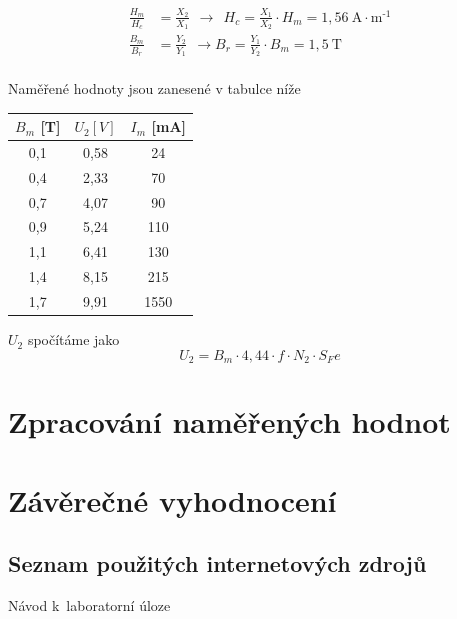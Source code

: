 \documentclass[a4paper,12pt]{article}   %
\begin{document}
\begin{equation}
  \begin{split}
    \frac{H_m}{H_c} &= \frac{X_2}{X_1} ~~\rightarrow~~H_c = \frac{X_1}{X_2}\cdot H_m = 1,56~\text{A}\cdot\text{m}^\text{-1}\\
    \frac{B_m}{B_r} &= \frac{Y_2}{Y_1} ~~\rightarrow B_r = \frac{Y_1}{Y_2}\cdot B_m = 1,5~\text{T}\\
  \end{split}
\end{equation}

Naměřené hodnoty jsou zanesené v tabulce níže
\begin{table}[h!]
  \centering
  \begin{tabular}{|c|c|c|}
  \hline
  $B_m$ [T] &$U_\text{2} [V]$& $I_m$ [mA]\\\hline\hline
  0,1 & 0,58  & 24   \\ \hline
  0,4 & 2,33  & 70   \\ \hline
  0,7 & 4,07  & 90   \\ \hline
  0,9 & 5,24  & 110  \\ \hline
  1,1 & 6,41  & 130  \\ \hline
  1,4 & 8,15  & 215  \\ \hline
  1,7 & 9,91  & 1550 \\ \hline
  \end{tabular}
\end{table}
$U_2$ spočítáme jako
\begin{equation}
  U_2 = B_m\cdot 4,44 \cdot f\cdot N_2\cdot S_Fe
\end{equation}

\section{Zpracování naměřených hodnot}
\label{chap:zpracovani_hodnot}



\section{Závěrečné vyhodnocení}
\label{chap:zaver}



\clearpage
\renewcommand{\refname}{Seznam použité literatury a~zdrojů informací} 

\begin{thebibliography}{99}

\subsection*{Seznam použitých internetových zdrojů}
     Návod k~laboratorní úloze
    
\end{thebibliography}
\end{document}
